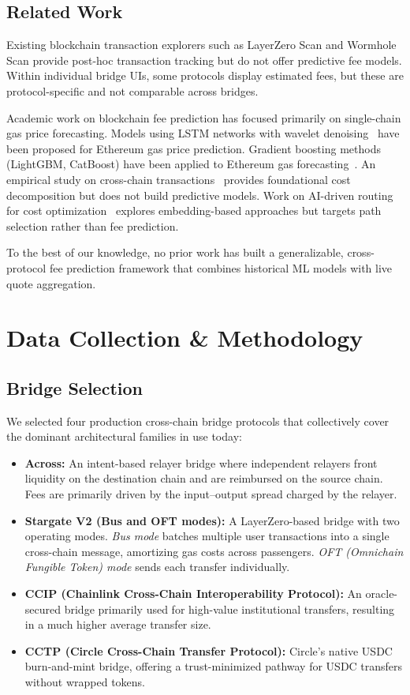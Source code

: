 \subsection{Related Work}
Existing blockchain transaction explorers such as LayerZero Scan and Wormhole Scan provide post-hoc transaction tracking but do not offer predictive fee models. Within individual bridge UIs, some protocols display estimated fees, but these are protocol-specific and not comparable across bridges.

Academic work on blockchain fee prediction has focused primarily on single-chain gas price forecasting. Models using LSTM networks with wavelet denoising~\cite{lstm_gas} have been proposed for Ethereum gas price prediction. Gradient boosting methods (LightGBM, CatBoost) have been applied to Ethereum gas forecasting~\cite{gbm_gas}. An empirical study on cross-chain transactions~\cite{empirical_cc} provides foundational cost decomposition but does not build predictive models. Work on AI-driven routing for cost optimization~\cite{ai_routing} explores embedding-based approaches but targets path selection rather than fee prediction.

To the best of our knowledge, no prior work has built a generalizable, cross-protocol fee prediction framework that combines historical ML models with live quote aggregation.

\section{Data Collection \& Methodology}\label{sec: data_collection}

\subsection{Bridge Selection}
We selected four production cross-chain bridge protocols that collectively cover the dominant architectural families in use today:

\begin{itemize}
    \item \textbf{Across:} An intent-based relayer bridge where independent relayers front liquidity on the destination chain and are reimbursed on the source chain. Fees are primarily driven by the input--output spread charged by the relayer.
    \item \textbf{Stargate V2 (Bus and OFT modes):} A LayerZero-based bridge with two operating modes. \textit{Bus mode} batches multiple user transactions into a single cross-chain message, amortizing gas costs across passengers. \textit{OFT (Omnichain Fungible Token) mode} sends each transfer individually.
    \item \textbf{CCIP (Chainlink Cross-Chain Interoperability Protocol):} An oracle-secured bridge primarily used for high-value institutional transfers, resulting in a much higher average transfer size.
    \item \textbf{CCTP (Circle Cross-Chain Transfer Protocol):} Circle's native USDC burn-and-mint bridge, offering a trust-minimized pathway for USDC transfers without wrapped tokens.
\end{itemize}

